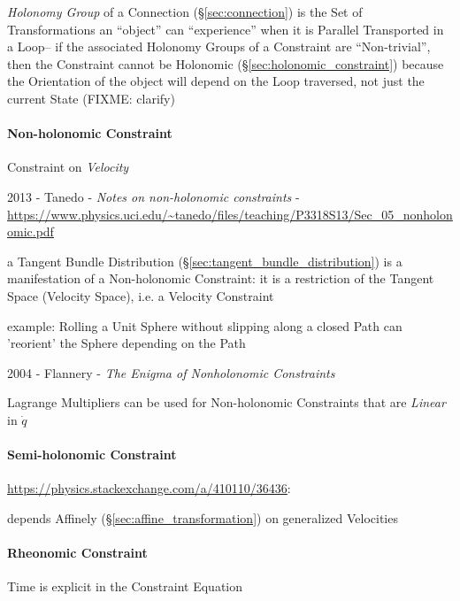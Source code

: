 \emph{Holonomy Group} of a Connection (\S\ref{sec:connection}) is the Set of
Transformations an ``object'' can ``experience'' when it is Parallel
Transported in a Loop-- if the associated Holonomy Groups of a Constraint are
``Non-trivial'', then the Constraint cannot be Holonomic
(\S\ref{sec:holonomic_constraint}) because the Orientation of the object will
depend on the Loop traversed, not just the current State (FIXME: clarify)



\paragraph{Non-holonomic Constraint}\label{sec:nonholonomic_constraint}\hfill

Constraint on \emph{Velocity}

2013 - Tanedo - \emph{Notes on non-holonomic constraints} -
\url{https://www.physics.uci.edu/~tanedo/files/teaching/P3318S13/Sec_05_nonholonomic.pdf}

a Tangent Bundle Distribution (\S\ref{sec:tangent_bundle_distribution}) is a
manifestation of a Non-holonomic Constraint: it is a restriction of the Tangent
Space (Velocity Space), i.e. a Velocity Constraint

example: Rolling a Unit Sphere without slipping along a closed Path can
'reorient' the Sphere depending on the Path

2004 - Flannery - \emph{The Enigma of Nonholonomic Constraints}

Lagrange Multipliers can be used for Non-holonomic Constraints that are
\emph{Linear} in $\dot{q}$



\paragraph{Semi-holonomic Constraint}\label{sec:semiholonomic_constraint}\hfill

\url{https://physics.stackexchange.com/a/410110/36436}:

depends Affinely (\S\ref{sec:affine_transformation}) on generalized Velocities



\paragraph{Rheonomic Constraint}\label{sec:rheonomic_constraint}\hfill

Time is explicit in the Constraint Equation



